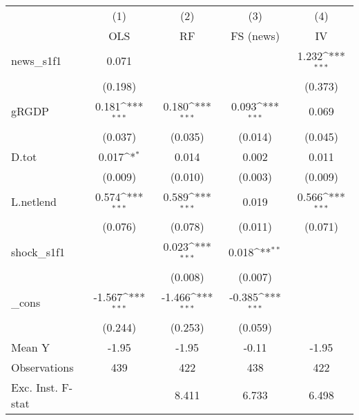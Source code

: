 {
\def\sym#1{\ifmmode^{#1}\else\(^{#1}\)\fi}
\begin{tabular}{l*{4}{c}}
\toprule
            &\multicolumn{1}{c}{(1)}&\multicolumn{1}{c}{(2)}&\multicolumn{1}{c}{(3)}&\multicolumn{1}{c}{(4)}\\
            &\multicolumn{1}{c}{OLS}&\multicolumn{1}{c}{RF}&\multicolumn{1}{c}{FS (news)}&\multicolumn{1}{c}{IV}\\
\midrule
news\_s1f1   &       0.071         &                     &                     &       1.232\sym{***}\\
            &     (0.198)         &                     &                     &     (0.373)         \\
\addlinespace
gRGDP       &       0.181\sym{***}&       0.180\sym{***}&       0.093\sym{***}&       0.069         \\
            &     (0.037)         &     (0.035)         &     (0.014)         &     (0.045)         \\
\addlinespace
D.tot       &       0.017\sym{*}  &       0.014         &       0.002         &       0.011         \\
            &     (0.009)         &     (0.010)         &     (0.003)         &     (0.009)         \\
\addlinespace
L.netlend   &       0.574\sym{***}&       0.589\sym{***}&       0.019         &       0.566\sym{***}\\
            &     (0.076)         &     (0.078)         &     (0.011)         &     (0.071)         \\
\addlinespace
shock\_s1f1  &                     &       0.023\sym{***}&       0.018\sym{**} &                     \\
            &                     &     (0.008)         &     (0.007)         &                     \\
\addlinespace
\_cons      &      -1.567\sym{***}&      -1.466\sym{***}&      -0.385\sym{***}&                     \\
            &     (0.244)         &     (0.253)         &     (0.059)         &                     \\
\midrule
Mean Y      &       -1.95         &       -1.95         &       -0.11         &       -1.95         \\
Observations&         439         &         422         &         438         &         422         \\
Exc. Inst. F-stat&                     &       8.411         &       6.733         &       6.498         \\
\bottomrule
\end{tabular}
}
